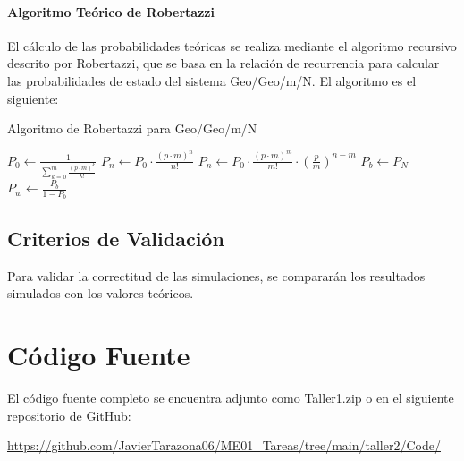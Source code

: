 \documentclass{article}
\begin{document}
\paragraph{Algoritmo Teórico de Robertazzi}

El cálculo de las probabilidades teóricas se realiza mediante el algoritmo recursivo descrito por Robertazzi, que se basa en la relación de recurrencia para calcular las probabilidades de estado del sistema Geo/Geo/m/N. El algoritmo es el siguiente:

\begin{algorithm}[H]
\caption{Algoritmo de Robertazzi para Geo/Geo/m/N}
\begin{algorithmic}[1]
\STATE $P_0 \leftarrow \frac{1}{\sum_{k=0}^{m} \frac{(p \cdot m)^k}{k!}}$ 
        \STATE $P_n \leftarrow P_0 \cdot \frac{(p \cdot m)^n}{n!}$
    \ELSE
        \STATE $P_n \leftarrow P_0 \cdot \frac{(p \cdot m)^m}{m!} \cdot \left(\frac{p}{m}\right)^{n-m}$
    \ENDIF
\ENDFOR
\STATE $P_b \leftarrow P_N$ 
\STATE $P_w \leftarrow \frac{P_b}{1 - P_b}$ 
\end{algorithmic}
\end{algorithm}

\subsection{Criterios de Validación}

Para validar la correctitud de las simulaciones, se compararán los resultados simulados con los valores teóricos.



\section{Código Fuente}\label{sec:cod}

El código fuente completo se encuentra adjunto como Taller1.zip
o en el siguiente repositorio de GitHub:

\begin{center}
\url{https://github.com/JavierTarazona06/ME01_Tareas/tree/main/taller2/Code/}
\end{center}
\end{document}
